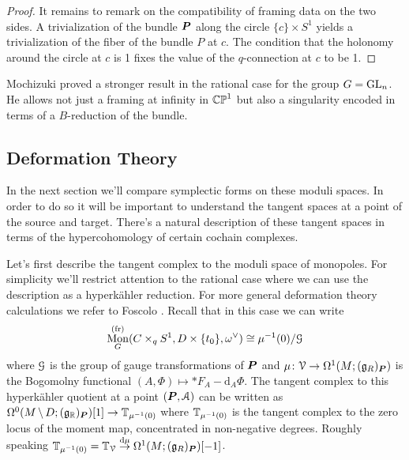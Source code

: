 \documentclass[10pt, oneside]{article}
\DeclareMathOperator{\mon}{Mon}
\renewcommand{\d}{\mathrm{d}}
\newcommand{\fr}{\mathrm{fr}}
\begin{document}
\begin{proof}
It remains to remark on the compatibility of framing data on the two sides.  A trivialization of the bundle $\boldsymbol{P}$ along the circle $\{c\} \times S^1$ yields a trivialization of the fiber of the bundle $P$ at $c$.  The condition that the holonomy around the circle at $c$ is 1 fixes the value of the $q$-connection at $c$ to be 1.

\end{proof}

\begin{remark}
Mochizuki \cite{Mochizuki} proved a stronger result in the rational case for the group $G = \mathrm{GL}_n$.  He allows not just a framing at infinity in $\mathbb{CP}^1$ but also a singularity encoded in terms of a $B$-reduction of the bundle. 
\end{remark}

\subsection{Deformation Theory} \label{def_section}


In the next section we'll compare symplectic forms on these moduli spaces.  In order to do so it will be important to understand the tangent spaces at a point of the source and target.  There's a natural description of these tangent spaces in terms of the hypercohomology of certain cochain complexes.

Let's first describe the tangent complex to the moduli space of monopoles.  For simplicity we'll restrict attention to the rational case where we can use the description as a hyperk\"ahler reduction.  For more general deformation theory calculations we refer to Foscolo \cite{FoscoloDef}.  Recall that in this case we can write
\[\mon^{(\fr)}_G(C \times_q S^1, D \times \{t_0\}, \omega^\vee) \iso \mu^{-1}(0)/ \mc G\]
where $\mathcal{G}$ is the group of gauge transformations of $\boldsymbol{P}$ and $\mu \colon \mathcal{V} \to \Omega^1(M; (\mathfrak{g}_R)_{\boldsymbol{P}})$ is the Bogomolny functional $(A,\Phi) \mapsto \ast F_A - \d_A \Phi$.  The tangent complex to this hyperk\"ahler quotient at a point $(\boldsymbol{P}, \mathcal{A})$ can be written as $\Omega^0(M \!\ \backslash \ \! D; (\mathfrak{g}_{\mathbb{R}})_{\boldsymbol{P}})[1] \to \mathbb{T}_{\mu^{-1}(0)}$ where $\mathbb{T}_{\mu^{-1}(0)}$ is the tangent complex to the zero locus of the moment map, concentrated in non-negative degrees. Roughly speaking $\bb T_{\mu^{-1}(0)} = \bb T_{\mc V} \overset {\d\mu} \to \Omega^1(M; (\gg_R)_{\bo P})[-1]$.  
\end{document}
